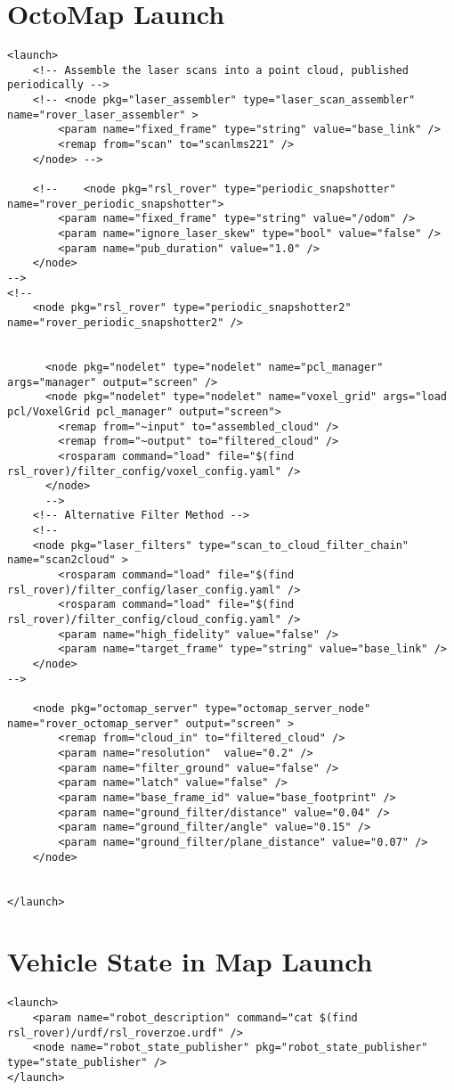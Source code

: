 \section*{OctoMap Launch}
\begin{lstlisting}[breaklines=true,basicstyle=\tiny]
<launch> 
	<!-- Assemble the laser scans into a point cloud, published periodically -->
	<!-- <node pkg="laser_assembler" type="laser_scan_assembler" name="rover_laser_assembler" >
		<param name="fixed_frame" type="string" value="base_link" />
		<remap from="scan" to="scanlms221" />
	</node> -->

	<!--	<node pkg="rsl_rover" type="periodic_snapshotter" name="rover_periodic_snapshotter">
		<param name="fixed_frame" type="string" value="/odom" />
		<param name="ignore_laser_skew" type="bool" value="false" />	
		<param name="pub_duration" value="1.0" />
	</node>
-->
<!--
	<node pkg="rsl_rover" type="periodic_snapshotter2" name="rover_periodic_snapshotter2" />


	  <node pkg="nodelet" type="nodelet" name="pcl_manager" args="manager" output="screen" />
	  <node pkg="nodelet" type="nodelet" name="voxel_grid" args="load pcl/VoxelGrid pcl_manager" output="screen">
		<remap from="~input" to="assembled_cloud" />
		<remap from="~output" to="filtered_cloud" />
		<rosparam command="load" file="$(find rsl_rover)/filter_config/voxel_config.yaml" />
	  </node>
	  -->
	<!-- Alternative Filter Method -->
	<!--
	<node pkg="laser_filters" type="scan_to_cloud_filter_chain" name="scan2cloud" >
		<rosparam command="load" file="$(find rsl_rover)/filter_config/laser_config.yaml" />
		<rosparam command="load" file="$(find rsl_rover)/filter_config/cloud_config.yaml" />
		<param name="high_fidelity" value="false" />
		<param name="target_frame" type="string" value="base_link" />
	</node>
-->

	<node pkg="octomap_server" type="octomap_server_node" name="rover_octomap_server" output="screen" >
		<remap from="cloud_in" to="filtered_cloud" />
		<param name="resolution"  value="0.2" />
		<param name="filter_ground" value="false" />
		<param name="latch" value="false" />
		<param name="base_frame_id" value="base_footprint" />
		<param name="ground_filter/distance" value="0.04" />
		<param name="ground_filter/angle" value="0.15" />
		<param name="ground_filter/plane_distance" value="0.07" />
	</node>


</launch>
\end{lstlisting}


\section*{Vehicle State in Map Launch}
\begin{lstlisting}[breaklines=true,basicstyle=\tiny]
<launch>
	<param name="robot_description" command="cat $(find rsl_rover)/urdf/rsl_roverzoe.urdf" />
	<node name="robot_state_publisher" pkg="robot_state_publisher" type="state_publisher" />
</launch>
\end{lstlisting}


